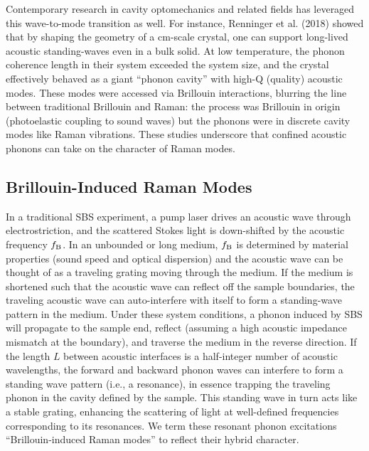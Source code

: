Contemporary research in cavity optomechanics and related fields has leveraged this wave-to-mode transition as well. For instance, Renninger et al. (2018) \cite{renninger2018bulk} showed that by shaping the geometry of a \si{\centi\meter}-scale crystal, one can support long-lived acoustic standing-waves even in a bulk solid. At low temperature, the phonon coherence length in their system exceeded the system size, and the crystal effectively behaved as a giant “phonon cavity” with high-Q (quality) acoustic modes. \cite{renninger2018bulk, maccabe2020nano} These modes were accessed via Brillouin interactions, blurring the line between traditional Brillouin and Raman: the process was Brillouin in origin (photoelastic coupling to sound waves) but the phonons were in discrete cavity modes like Raman vibrations. These studies underscore that confined acoustic phonons can take on the character of Raman modes.

\subsection{Brillouin-Induced Raman Modes}
\label{subsec:Raman:Brillouin-InducedRamanModes}

In a traditional SBS experiment, a pump laser drives an acoustic wave through electrostriction, and the scattered Stokes light is down-shifted by the acoustic frequency \(f_{\rm B}\). In an unbounded or long medium, \(f_{\rm B}\) is determined by material properties (sound speed and optical dispersion) and the acoustic wave can be thought of as a traveling grating moving through the medium. If the medium is shortened such that the acoustic wave can reflect off the sample boundaries, the traveling acoustic wave can auto-interfere with itself to form a standing-wave pattern in the medium. Under these system conditions, a phonon induced by \ac{SBS} will propagate to the sample end, reflect (assuming a high acoustic impedance mismatch at the boundary), and traverse the medium in the reverse direction. If the length \(L\) between acoustic interfaces is a half-integer number of acoustic wavelengths, the forward and backward phonon waves can interfere to form a standing wave pattern (i.e., a resonance), in essence trapping the traveling phonon in the cavity defined by the sample. This standing wave in turn acts like a stable grating, enhancing the scattering of light at well-defined frequencies corresponding to its resonances. We term these resonant phonon excitations “Brillouin-induced Raman modes” to reflect their hybrid character.

